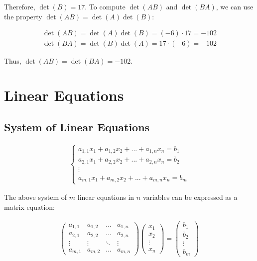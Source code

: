\documentclass{article}
\begin{document}
\begin{enumerate}
          Therefore, $\det(B) = 17$. To compute $\det(AB)$ and $\det(BA)$, we can use the property $\det(AB) = \det(A) \det(B)$:

          \begin{align*}
              \det(AB) = \det(A) \det(B) = (-6) \cdot 17 = -102 \\
              \det(BA) = \det(B) \det(A) = 17 \cdot (-6) = -102
          \end{align*}

          Thus, $\det(AB) = \det(BA) = -102$.
\end{enumerate}

\section{Linear Equations}

\subsection{System of Linear Equations}

\begin{align*}
    \begin{cases}
        a_{1,1}x_1 + a_{1,2}x_2 + ... + a_{1,n}x_n = b_1 \\
        a_{2,1}x_1 + a_{2,2}x_2 + ... + a_{2,n}x_n = b_2 \\
        \vdots                                           \\
        a_{m,1}x_1 + a_{m,2}x_2 + ... + a_{m,n}x_n = b_m
    \end{cases}
\end{align*}

The above system of $m$ linear equations in $n$ variables can be expressed as a matrix equation:

\begin{align*}
    \begin{pmatrix}
        a_{1,1} & a_{1,2} & ...    & a_{1,n} \\
        a_{2,1} & a_{2,2} & ...    & a_{2,n} \\
        \vdots  & \vdots  & \ddots & \vdots  \\
        a_{m,1} & a_{m,2} & ...    & a_{m,n}
    \end{pmatrix}
    \begin{pmatrix}
        x_1    \\
        x_2    \\
        \vdots \\
        x_n
    \end{pmatrix}
    =
    \begin{pmatrix}
        b_1    \\
        b_2    \\
        \vdots \\
        b_m
    \end{pmatrix}
\end{align*}
\end{document}
